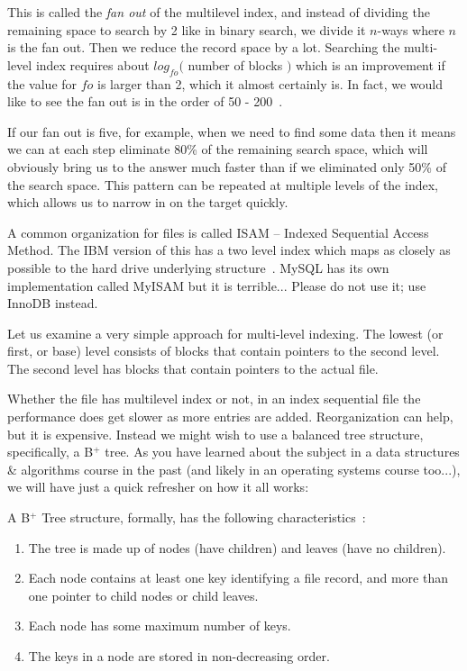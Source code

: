 \documentclass[a4paper]{report}
\begin{document}
This is called the \textit{fan out} of the multilevel index, and instead of dividing the remaining space to search by 2 like in binary search, we divide it $n$-ways where $n$ is the fan out. Then we reduce the record space by a lot. Searching the multi-level index requires about $log_{fo}($ number of blocks $)$ which is an improvement if the value for $fo$ is larger than 2, which it almost certainly is. In fact, we would like to see the fan out is in the order of 50 - 200~\cite{fds}.

If our fan out is five, for example, when we need to find some data then it means we can at each step eliminate 80\% of the remaining search space, which will obviously bring us to the answer much faster than if we eliminated only 50\% of the search space. This pattern can be repeated at multiple levels of the index, which allows us to narrow in on the target quickly.

A common organization for files is called ISAM -- Indexed Sequential Access Method. The IBM version of this has a two level index which maps as closely as possible to the hard drive underlying structure~\cite{fds}. MySQL has its own implementation called MyISAM but it is terrible... Please do not use it; use InnoDB instead. 

Let us examine a very simple approach for multi-level indexing. The lowest (or first, or base) level consists of blocks that contain pointers to the second level. The second level has blocks that contain pointers to the actual file. 

Whether the file has multilevel index or not, in an index sequential file the performance does get slower as more entries are added. Reorganization can help, but it is expensive. Instead we might wish to use a balanced tree structure, specifically, a B$^{+}$ tree. As you have learned about the subject in a data structures \& algorithms course in the past (and likely in an operating systems course too...), we will have just a quick refresher on how it all works:

A B$^{+}$ Tree structure, formally, has the following characteristics~\cite{osi}:

\begin{enumerate}
	\item The tree is made up of nodes (have children) and leaves (have no children).
	\item Each node contains at least one key identifying a file record, and more than one pointer to child nodes or child leaves.
	\item Each node has some maximum number of keys.
	\item The keys in a node are stored in non-decreasing order.
\end{enumerate}
\end{document}
